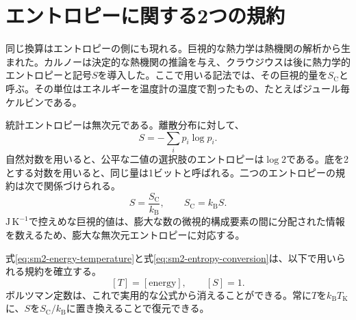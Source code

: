 \section{エントロピーに関する2つの規約}

同じ換算はエントロピーの側にも現れる。巨視的な熱力学は熱機関の解析から生まれた。カルノーは決定的な熱機関の推論を与え、クラウジウスは後に熱力学的エントロピーと記号\(S\)を導入した。ここで用いる記法では、その巨視的量を\(S_{\mathrm C}\)と呼ぶ。その単位はエネルギーを温度計の温度で割ったもの、たとえばジュール毎ケルビンである。

統計エントロピーは無次元である。離散分布に対して、
\begin{equation}
 S=-\sum_i p_i\log p_i.
 \label{eq:sm2-statistical-entropy}
\end{equation}
自然対数を用いると、公平な二値の選択肢のエントロピーは\(\log2\)である。底を2とする対数を用いると、同じ量は1ビットと呼ばれる。二つのエントロピーの規約は次で関係づけられる。
\begin{equation}
 S=\frac{S_{\mathrm C}}{k_{\mathrm B}},
 \qquad
 S_{\mathrm C}=k_{\mathrm B}S.
 \label{eq:sm2-entropy-conversion}
\end{equation}
\(\mathrm{J\,K^{-1}}\)で控えめな巨視的値は、膨大な数の微視的構成要素の間に分配された情報を数えるため、膨大な無次元エントロピーに対応する。

式\eqref{eq:sm2-energy-temperature}と式\eqref{eq:sm2-entropy-conversion}は、以下で用いられる規約を確立する。
\[
 [T]=[\text{energy}],
 \qquad
 [S]=1.
\]
ボルツマン定数は、これで実用的な公式から消えることができる。常に\(T\)を\(k_{\mathrm B}T_{\mathrm K}\)に、\(S\)を\(S_{\mathrm C}/k_{\mathrm B}\)に置き換えることで復元できる。

\begin{classroomqa}
\end{classroomqa}

\begin{classroomqa}
\end{classroomqa}

